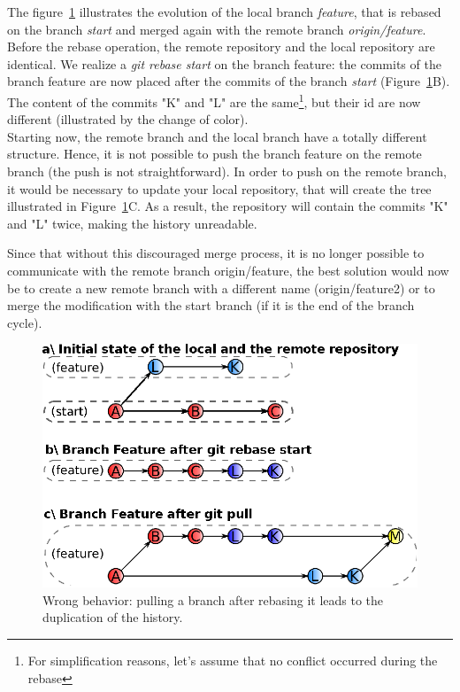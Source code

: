 The figure~\ref{fig:rebase-warning} illustrates the evolution of the local branch \textit{feature}, that is rebased on the branch \textit{start} and merged again with the remote branch \textit{origin/feature}.
Before the rebase operation, the remote repository and the local repository are identical.
We realize a \textit{git rebase start} on the branch feature: the commits of the branch feature are now placed after the commits of the branch \textit{start} (Figure~\ref{fig:rebase-warning}B).
The content of the commits "K" and "L" are the same\footnote{For simplification reasons, let's assume that no conflict occurred during the rebase}, but their id are now different (illustrated by the change of color).\\

Starting now, the remote branch and the local branch have a totally different structure. 
Hence, it is not possible to push the branch feature on the remote branch (the push is not straightforward).
In order to push on the remote branch, it would be necessary to update your local repository, that will create the tree illustrated in Figure~\ref{fig:rebase-warning}C. 
As a result, the repository will contain the commits "K" and "L" twice, making the history unreadable.

Since that without this discouraged merge process, it is no longer possible to communicate with the remote branch origin/feature, the best solution would now be to create a new remote branch with a different name (origin/feature2) or to merge the modification with the start branch (if it is the end of the branch cycle).


\begin{figure}[htb]
\centering
\includegraphics[scale=1]{img/rebase-warning.eps}
\caption{Wrong behavior: pulling a branch after rebasing it leads to the duplication of the history.}
\label{fig:rebase-warning}
\end{figure}








